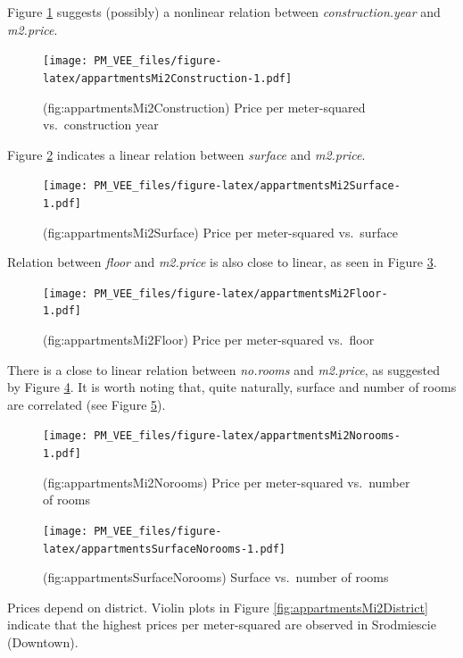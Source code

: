 \documentclass[12pt,]{krantz}
\theoremstyle{definition}
\theoremstyle{definition}
\theoremstyle{definition}
\theoremstyle{remark}
\begin{document}
Figure \ref{fig:appartmentsMi2Construction} suggests (possibly) a
nonlinear relation between \emph{construction.year} and \emph{m2.price}.

\begin{figure}
\centering
\texttt{[image: PM\_VEE\_files/figure-latex/appartmentsMi2Construction-1.pdf]}
\caption{\label{fig:appartmentsMi2Construction}(fig:appartmentsMi2Construction)
Price per meter-squared vs.~construction year}
\end{figure}

Figure \ref{fig:appartmentsMi2Surface} indicates a linear relation
between \emph{surface} and \emph{m2.price}.

\begin{figure}
\centering
\texttt{[image: PM\_VEE\_files/figure-latex/appartmentsMi2Surface-1.pdf]}
\caption{\label{fig:appartmentsMi2Surface}(fig:appartmentsMi2Surface) Price
per meter-squared vs.~surface}
\end{figure}

Relation between \emph{floor} and \emph{m2.price} is also close to
linear, as seen in Figure \ref{fig:appartmentsMi2Floor}.

\begin{figure}
\centering
\texttt{[image: PM\_VEE\_files/figure-latex/appartmentsMi2Floor-1.pdf]}
\caption{\label{fig:appartmentsMi2Floor}(fig:appartmentsMi2Floor) Price per
meter-squared vs.~floor}
\end{figure}

There is a close to linear relation between \emph{no.rooms} and
\emph{m2.price}, as suggested by Figure \ref{fig:appartmentsMi2Norooms}.
It is worth noting that, quite naturally, surface and number of rooms
are correlated (see Figure \ref{fig:appartmentsSurfaceNorooms}).

\begin{figure}
\centering
\texttt{[image: PM\_VEE\_files/figure-latex/appartmentsMi2Norooms-1.pdf]}
\caption{\label{fig:appartmentsMi2Norooms}(fig:appartmentsMi2Norooms) Price
per meter-squared vs.~number of rooms}
\end{figure}

\begin{figure}
\centering
\texttt{[image: PM\_VEE\_files/figure-latex/appartmentsSurfaceNorooms-1.pdf]}
\caption{\label{fig:appartmentsSurfaceNorooms}(fig:appartmentsSurfaceNorooms)
Surface vs.~number of rooms}
\end{figure}

Prices depend on district. Violin plots in Figure
\ref{fig:appartmentsMi2District} indicate that the highest prices per
meter-squared are observed in Srodmiescie (Downtown).
\end{document}
